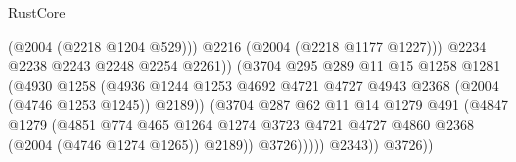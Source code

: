 \begin{lexlean}{RustCore}
\begin{coremodule}
                                              (@2004 (@2218 @1204 @529)))
                                            @2216
                                            (@2004 (@2218 @1177 @1227)))
                                          @2234
                                          @2238
                                          @2243
                                          @2248
                                          @2254
                                          @2261))
                                      (@3704
                                        @295
                                        @289
                                        @11
                                        @15
                                        @1258
                                        @1281
                                        (@4930
                                          @1258
                                          (@4936
                                            @1244
                                            @1253
                                            @4692
                                            @4721
                                            @4727
                                            @4943
                                            @2368
                                            (@2004 (@4746 @1253 @1245))
                                            @2189))
                                        (@3704
                                          @287
                                          @62
                                          @11
                                          @14
                                          @1279
                                          @491
                                          (@4847
                                            @1279
                                            (@4851
                                              @774
                                              @465
                                              @1264
                                              @1274
                                              @3723
                                              @4721
                                              @4727
                                              @4860
                                              @2368
                                              (@2004 (@4746 @1274 @1265))
                                              @2189))
                                          @3726)))))
                                @2343))
                            @3726))

\end{coremodule}
\end{lexlean}
